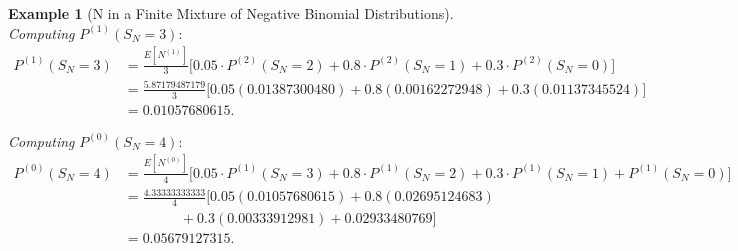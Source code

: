 \documentclass[11pt]{amsart}
\theoremstyle{definition}
\newtheorem{example}{Example}
\theoremstyle{plain}
\begin{document}
\begin{example}[N in a Finite Mixture of Negative Binomial Distributions]
\noindent\textit{Computing} $P^{(1)}(S_N = 3)$:
\begin{align*}
P^{(1)}(S_N = 3)
    &= \frac{E[N^{(1)}]}{3}
       \bigl[0.05 \cdot P^{(2)}(S_N = 2) + 0.8 \cdot P^{(2)}(S_N = 1)
       + 0.3 \cdot P^{(2)}(S_N = 0)\bigr] \\
    &= \frac{5.87179487179}{3}
       \bigl[0.05(0.01387300480) + 0.8(0.00162272948)
       + 0.3(0.01137345524)\bigr] \\
    &= 0.01057680615.
\end{align*}

\noindent\textit{Computing} $P^{(0)}(S_N = 4)$:
\begin{align*}
P^{(0)}(S_N = 4)
    &= \frac{E[N^{(0)}]}{4}
       \bigl[0.05 \cdot P^{(1)}(S_N = 3) + 0.8 \cdot P^{(1)}(S_N = 2)
       + 0.3 \cdot P^{(1)}(S_N = 1) + P^{(1)}(S_N = 0)\bigr] \\
    &= \frac{4.33333333333}{4}
       \bigl[0.05(0.01057680615) + 0.8(0.02695124683) \\
    &\qquad\qquad + 0.3(0.00333912981) + 0.02933480769\bigr] \\
    &= \boxed{0.05679127315}.
\end{align*}
\end{example}
\end{document}
